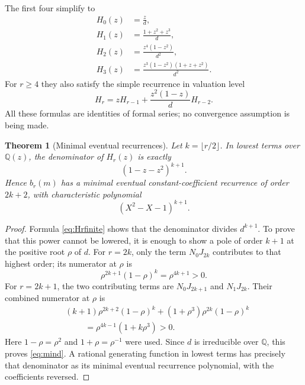 \documentclass[11pt]{article}
\newtheorem{theorem}{Theorem}[section]
\theoremstyle{definition}\newtheorem{definition}[theorem]{Definition}
\theoremstyle{remark}\newtheorem{remark}[theorem]{Remark}
\newcommand{\Q}{\mathbb Q}
\begin{document}
The first four simplify to
\begin{align}
 H_0(z)&=\frac{z}{d},\label{eq:H0}\\
 H_1(z)&=\frac{1+z^2+z^3}{d},\label{eq:H1}\\
 H_2(z)&=\frac{z^4(1-z^2)}{d^2},\label{eq:H2}\\
 H_3(z)&=\frac{z^3(1-z^2)(1+z+z^2)}{d^2}.\label{eq:H3}
\end{align}
For $r\geq4$ they also satisfy the simple recurrence in valuation level
\begin{equation}\label{eq:Hrec}
 H_r=zH_{r-1}+\frac{z^2(1-z)}{d}H_{r-2}.
\end{equation}
All these formulas are identities of formal series; no convergence
assumption is being made.

\begin{theorem}[Minimal eventual recurrences]\label{thm:minrec}
Let $k=\lfloor r/2\rfloor$. In lowest terms over $\Q(z)$, the denominator
of $H_r(z)$ is exactly
\begin{equation}\label{eq:mind}
 (1-z-z^2)^{k+1}.
\end{equation}
Hence $b_r(m)$ has a minimal eventual constant-coefficient recurrence of
order $2k+2$, with characteristic polynomial
\[
 (X^2-X-1)^{k+1}.
\]
\end{theorem}
\begin{proof}
Formula \eqref{eq:Hrfinite} shows that the denominator divides
$d^{k+1}$. To prove that this power cannot be lowered, it is enough to
show a pole of order $k+1$ at the positive root $\rho$ of $d$.
For $r=2k$, only the term $N_0J_{2k}$ contributes to that highest order;
its numerator at $\rho$ is
\[
 \rho^{2k+1}(1-\rho)^k=\rho^{4k+1}>0.
\]
For $r=2k+1$, the two contributing terms are $N_0J_{2k+1}$ and
$N_1J_{2k}$. Their combined numerator at $\rho$ is
\begin{align*}
 &(k+1)\rho^{2k+2}(1-\rho)^k
 +(1+\rho^3)\rho^{2k}(1-\rho)^k\\
 &\hspace{1cm}=\rho^{4k-1}(1+k\rho^3)>0.
\end{align*}
Here $1-\rho=\rho^2$ and $1+\rho=\rho^{-1}$ were used. Since $d$ is
irreducible over $\Q$, this proves \eqref{eq:mind}. A rational generating
function in lowest terms has precisely that denominator as its minimal
eventual recurrence polynomial, with the coefficients reversed.
\end{proof}
\end{document}

